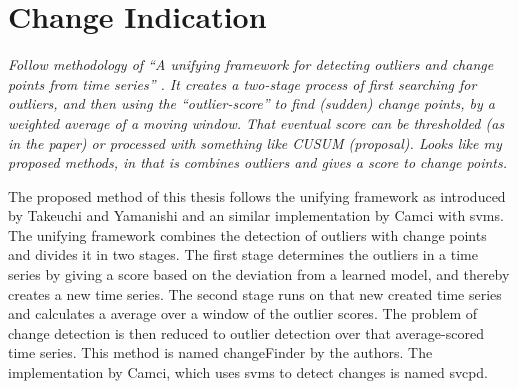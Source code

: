 \section{Change Indication}\label{sec:method_change_indication}
\TODO{***}
\emph{Follow methodology of ``A unifying framework for detecting outliers and change points from time series'' \cite{takeuchi2006unifying}.
It creates a two-stage process of first searching for outliers, and then using the ``outlier-score'' to find (sudden) change points, by a weighted average of a moving window.
That eventual score can be thresholded (as in the paper) or processed with something like CUSUM (proposal).
Looks like my proposed methods, in that is combines outliers and gives a score to change points.}

The proposed method of this thesis follows the unifying framework as introduced by Takeuchi and Yamanishi \cite{takeuchi2006unifying} and an similar implementation by Camci \cite{camci2010change} with \glspl{svm}.
The unifying framework combines the detection of outliers with change points and divides it in two stages.
The first stage determines the outliers in a time series by giving a score based on the deviation from a learned model, and thereby creates a new time series.
The second stage runs on that new created time series and calculates a average over a window of the outlier scores.
The problem of change detection is then reduced to outlier detection over that average-scored time series.
This method is named \gls{changeFinder} by the authors.
The implementation by Camci, which uses \glspl{svm} to detect changes is named \acrlong{svcpd}.


